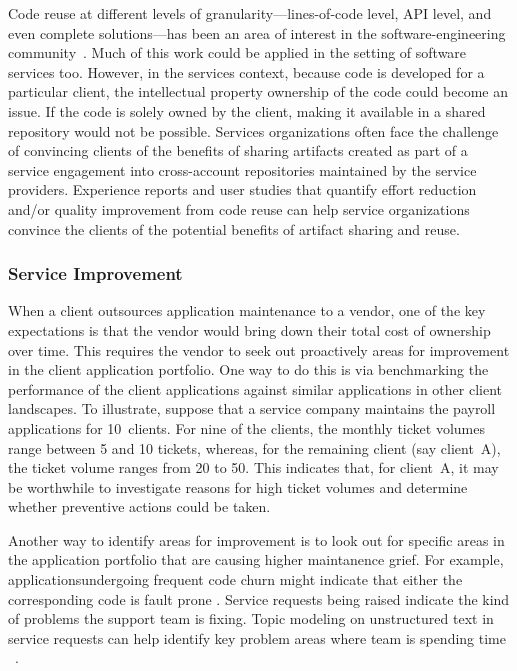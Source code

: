 Code reuse at different levels of granularity---lines-of-code level, API level,
and even complete solutions---has been an area of interest in the
software-engineering community~\cite{Holmes:2013,Reiss:2009}. Much of this work
could be applied in the setting of software services too. However, in the
services context, because code is developed for a particular client, the
intellectual property ownership of the code could become an issue. If the code
is solely owned by the client, making it available in a shared repository would
not be possible. Services organizations often face the challenge of convincing
clients of the benefits of sharing artifacts created as part of a service
engagement into cross-account repositories maintained by the service
providers. Experience reports and user studies that quantify effort reduction
and/or quality improvement from code reuse can help service organizations
convince the clients of the potential benefits of artifact sharing and reuse.

\subsubsection{Service Improvement}

When a client outsources application maintenance to a vendor, one of the key
expectations is that the vendor would bring down their total cost of ownership
over time. This requires the vendor to seek out proactively areas for
improvement in the client application portfolio. One way to do this is via
benchmarking the performance of the client applications against similar
applications in other client landscapes. To illustrate, suppose that a service
company maintains the payroll applications for 10~clients. For nine of the
clients, the monthly ticket volumes range between 5 and 10 tickets, whereas, for
the remaining client (say client~A), the ticket volume ranges from 20 to
50. This indicates that, for client~A, it may be worthwhile to investigate
reasons for high ticket volumes and determine whether preventive actions could
be taken. 

Another way to identify areas for improvement is to look out for specific areas in the application portfolio that are causing higher maintanence grief. For example, applicationsundergoing frequent code churn might indicate that either the corresponding code is fault prone \cite{Nag2005}. Service requests being raised indicate the kind of problems the support team is fixing. Topic modeling on unstructured text in service requests can help identify key problem areas where team is spending time ~\cite{mani2014}. 

